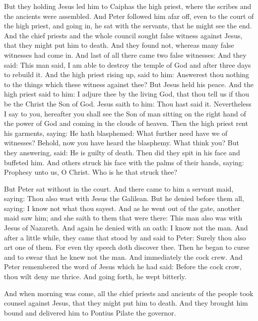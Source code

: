 But they holding Jesus led him to Caiphas the high priest, where the scribes
and the ancients were assembled.  And Peter followed him afar off, even to the
court of the high priest, and going in, he sat with the servants, that he might
see the end.  And the chief priests and the whole council sought false witness
against Jesus, that they might put him to death.  And they found not, whereas
many false witnesses had come in. And last of all there came two false
witnesses: And they said: This man said, I am able to destroy the temple of God
and after three days to rebuild it.  And the high priest rising up, said to
him: Answerest thou nothing to the things which these witness against thee?
But Jesus held his peace. And the high priest said to him: I adjure thee by the
living God, that thou tell us if thou be the Christ the Son of God.  Jesus
saith to him: Thou hast said it. Nevertheless I say to you, hereafter you shall
see the Son of man sitting on the right hand of the power of God and coming in
the clouds of heaven.  Then the high priest rent his garments, saying: He hath
blasphemed: What further need have we of witnesses? Behold, now you have heard
the blasphemy.  What think you? But they answering, said: He is guilty of
death.  Then did they spit in his face and buffeted him. And others struck his
face with the palms of their hands, saying: Prophesy unto us, O Christ. Who is
he that struck thee?  

But Peter sat without in the court. And there came to him a servant maid,
saying: Thou also wast with Jesus the Galilean.  But he denied before them all,
saying: I know not what thou sayest.  And as he went out of the gate, another
maid saw him; and she saith to them that were there: This man also was with
Jesus of Nazareth.  And again he denied with an oath: I know not the man.  And
after a little while, they came that stood by and said to Peter: Surely thou
also art one of them. For even thy speech doth discover thee.  Then he began to
curse and to swear that he knew not the man. And immediately the cock crew.
And Peter remembered the word of Jesus which he had said: Before the cock crow,
thou wilt deny me thrice. And going forth, he wept bitterly.

And when morning was come, all the chief priests and ancients of the people
took counsel against Jesus, that they might put him to death.  And they brought
him bound and delivered him to Pontius Pilate the governor.  

